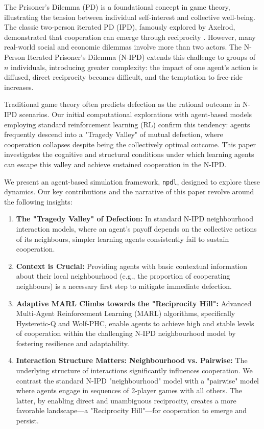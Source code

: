 \documentclass[]{llncs} %
\begin{document}
The Prisoner's Dilemma (PD) is a foundational concept in game theory, illustrating the tension between individual self-interest and collective well-being. The classic two-person iterated PD (IPD), famously explored by Axelrod, demonstrated that cooperation can emerge through reciprocity \cite{Axelrod}. %
However, many real-world social and economic dilemmas involve more than two actors. The N-Person Iterated Prisoner's Dilemma (N-IPD) extends this challenge to groups of $n$ individuals, introducing greater complexity: the impact of one agent's action is diffused, direct reciprocity becomes difficult, and the temptation to free-ride increases. %

Traditional game theory often predicts defection as the rational outcome in N-IPD scenarios. Our initial computational explorations with agent-based models employing standard reinforcement learning (RL) confirm this tendency: agents frequently descend into a "Tragedy Valley" of mutual defection, where cooperation collapses despite being the collectively optimal outcome. This paper investigates the cognitive and structural conditions under which learning agents can escape this valley and achieve sustained cooperation in the N-IPD.

We present an agent-based simulation framework, \texttt{npdl}, designed to explore these dynamics. Our key contributions and the narrative of this paper revolve around the following insights:
\begin{enumerate}
    \item \textbf{The "Tragedy Valley" of Defection:} In standard N-IPD neighbourhood interaction models, where an agent's payoff depends on the collective actions of its neighbours, simpler learning agents consistently fail to sustain cooperation.
    \item \textbf{Context is Crucial:} Providing agents with basic contextual information about their local neighbourhood (e.g., the proportion of cooperating neighbours) is a necessary first step to mitigate immediate defection.
    \item \textbf{Adaptive MARL Climbs towards the "Reciprocity Hill":} Advanced Multi-Agent Reinforcement Learning (MARL) algorithms, specifically Hysteretic-Q and Wolf-PHC, enable agents to achieve high and stable levels of cooperation within the challenging N-IPD neighbourhood model by fostering resilience and adaptability.
    \item \textbf{Interaction Structure Matters: Neighbourhood vs. Pairwise:} The underlying structure of interactions significantly influences cooperation. We contrast the standard N-IPD "neighbourhood" model with a "pairwise" model where agents engage in sequences of 2-player games with all others. The latter, by enabling direct and unambiguous reciprocity, creates a more favorable landscape—a "Reciprocity Hill"—for cooperation to emerge and persist.
\end{enumerate}
\end{document}
